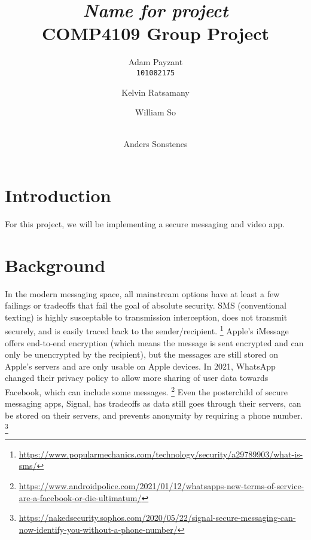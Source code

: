 \documentclass[titlepage]{article}
\title{\textit{Name for project} \\
    \large COMP4109 Group Project
}
\author{Adam Payzant \\ 
    \texttt{101082175} \\
    \and
    Kelvin Ratsamany \\
    \texttt{}
    \and
    William So \\ 
    \texttt{} \\
    \and
    Anders Sonstenes \\ 
    \texttt{}
}
\begin{document}
    \maketitle

    \section{Introduction}

    For this project, we will be implementing a secure messaging and video app. 

    \section{Background}

    In the modern messaging space, all mainstream options have at least a few failings or tradeoffs that fail the goal of absolute security. 
    SMS (conventional texting) is highly susceptable to transmission interception, does not transmit securely, and is easily traced back to the sender/recipient.
    \footnote{\url{https://www.popularmechanics.com/technology/security/a29789903/what-is-sms/}}
    Apple's iMessage offers end-to-end encryption (which means the message is sent encrypted and can only be unencrypted by the recipient), but the messages are still stored on Apple's servers and are only usable on Apple devices.
    In 2021, WhatsApp changed their privacy policy to allow more sharing of user data towards Facebook, which can include some messages. 
    \footnote{\url{https://www.androidpolice.com/2021/01/12/whatsapps-new-terms-of-service-are-a-facebook-or-die-ultimatum/}}
    Even the posterchild of secure messaging apps, Signal, has tradeoffs as data still goes through their servers, can be stored on their servers, and prevents anonymity by requiring a phone number.
    \footnote{\url{https://nakedsecurity.sophos.com/2020/05/22/signal-secure-messaging-can-now-identify-you-without-a-phone-number/}}\\
\end{document}
